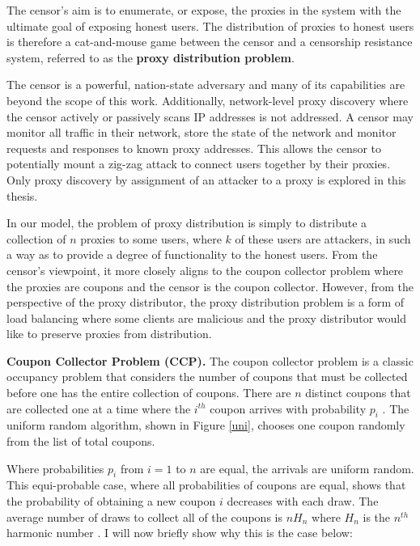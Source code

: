 The censor's aim is to enumerate, or expose, the proxies in the system with the ultimate goal of exposing honest users. The distribution of proxies to honest users is therefore a cat-and-mouse game between the censor and a censorship resistance system, referred to as the \textbf{proxy distribution problem}. 

The censor is a powerful, nation-state adversary and many of its capabilities are beyond the scope of this work. Additionally, network-level proxy discovery where the censor actively or passively scans IP addresses is not addressed. A censor may monitor all traffic in their network, store the state of the network and monitor requests and responses to known proxy addresses. This allows the censor to potentially mount a zig-zag attack to connect users together by their proxies. Only proxy discovery by assignment of an attacker to a proxy is explored in this thesis.

In our model, the problem of proxy distribution is simply to distribute a collection of $n$ proxies to some users, where $k$ of these users are attackers, in such a way as to provide a degree of functionality to the honest users. From the censor's viewpoint, it more closely aligns to the coupon collector problem where the proxies are coupons and the censor is the coupon collector. However, from the perspective of the proxy distributor, the proxy distribution problem is a form of load balancing where some clients are malicious and the proxy distributor would like to preserve proxies from distribution.

\textbf{Coupon Collector Problem (CCP).} The coupon collector problem is a classic occupancy problem that considers the number of coupons that must be collected before one has the entire collection of coupons. There are $n$ distinct coupons that are collected one at a time where the $i^{th}$ coupon arrives with probability $p_i$ \cite{motwani1995randomized}. The uniform random algorithm, shown in Figure \ref{uni}, chooses one coupon randomly from the list of total coupons.

Where probabilities $p_i$ from $i=1$ to $n$ are equal, the arrivals are uniform random. This equi-probable case, where all probabilities of coupons are equal, shows that the probability of obtaining a new coupon $i$ decreases with each draw. The average number of draws to collect all of the coupons is $nH_n$ where $H_n$ is the $n^{th}$ harmonic number \cite{flajolet1992birthday}. I will now briefly show why this is the case below: 

